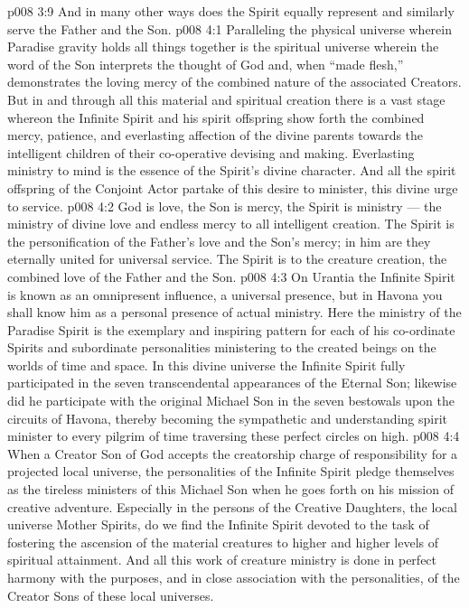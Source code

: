 \vs p008 3:9 And in many other ways does the Spirit equally represent and similarly serve the Father and the Son.
\vs p008 4:1 Paralleling the physical universe wherein Paradise gravity holds all things together is the spiritual universe wherein the word of the Son interprets the thought of God and, when “made flesh,” demonstrates the loving mercy of the combined nature of the associated Creators. But in and through all this material and spiritual creation there is a vast stage whereon the Infinite Spirit and his spirit offspring show forth the combined mercy, patience, and everlasting affection of the divine parents towards the intelligent children of their co\hyp{}operative devising and making. Everlasting ministry to mind is the essence of the Spirit’s divine character. And all the spirit offspring of the Conjoint Actor partake of this desire to minister, this divine urge to service.
\vs p008 4:2 God is love, the Son is mercy, the Spirit is ministry --- the ministry of divine love and endless mercy to all intelligent creation. The Spirit is the personification of the Father’s love and the Son’s mercy; in him are they eternally united for universal service. The Spirit is  to the creature creation, the combined love of the Father and the Son.
\vs p008 4:3 On Urantia the Infinite Spirit is known as an omnipresent influence, a universal presence, but in Havona you shall know him as a personal presence of actual ministry. Here the ministry of the Paradise Spirit is the exemplary and inspiring pattern for each of his co\hyp{}ordinate Spirits and subordinate personalities ministering to the created beings on the worlds of time and space. In this divine universe the Infinite Spirit fully participated in the seven transcendental appearances of the Eternal Son; likewise did he participate with the original Michael Son in the seven bestowals upon the circuits of Havona, thereby becoming the sympathetic and understanding spirit minister to every pilgrim of time traversing these perfect circles on high.
\vs p008 4:4 \pc When a Creator Son of God accepts the creatorship charge of responsibility for a projected local universe, the personalities of the Infinite Spirit pledge themselves as the tireless ministers of this Michael Son when he goes forth on his mission of creative adventure. Especially in the persons of the Creative Daughters, the local universe Mother Spirits, do we find the Infinite Spirit devoted to the task of fostering the ascension of the material creatures to higher and higher levels of spiritual attainment. And all this work of creature ministry is done in perfect harmony with the purposes, and in close association with the personalities, of the Creator Sons of these local universes.
